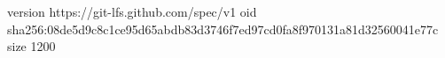 version https://git-lfs.github.com/spec/v1
oid sha256:08de5d9c8c1ce95d65abdb83d3746f7ed97cd0fa8f970131a81d32560041e77c
size 1200
